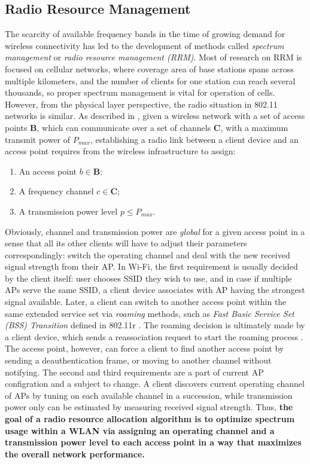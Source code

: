 \subsection{Radio Resource Management}
\label{chap:intro:sec:rrm}
The scarcity of available frequency bands in the time of growing demand for wireless connectivity has led to the development of methods called \textit{spectrum management} or \textit{radio resource management (RRM)}. Most of research on RRM is focused on cellular networks, where coverage area of base stations spans across multiple kilometers, and the number of clients for one station can reach several thousands, so proper spectrum management is vital for operation of cells. However, from the physical layer perspective, the radio situation in 802.11 networks is similar. As described in \cite{zanderRadioResourceManagement1997}, given a wireless network with a set of access points $\boldsymbol{B}$, which can communicate over a set of channels $\boldsymbol{C}$, with a maximum transmit power of $P_{max}$, establishing a radio link between a client device and an access point requires from the wireless infrastructure to assign:
\begin{enumerate}
    \item An access point $b \in \boldsymbol{B}$;
    \item A frequency channel $c \in \boldsymbol{C}$;
    \item A transmission power level $ p \leq P_{max}$.
\end{enumerate}
Obviously, channel and transmission power are \textit{global} for a given access point in a sense that all its other clients will have to adjust their parameters correspondingly: switch the operating channel and deal with the new received signal strength from their AP.
In Wi-Fi, the first requirement is usually decided by the client itself: user chooses SSID they wish to use, and in case if multiple APs serve the same SSID, a client device associates with AP having the strongest signal available. Later, a client can switch to another access point within the same extended service set via \textit{roaming} methods, such as \textit{Fast Basic Service Set (BSS) Transition} defined in 802.11r \cite{80211r}. The roaming decision is ultimately made by a client device, which sends a reassociation request to start the roaming process \cite{colemanCWNACertifiedWireless2021}. The access point, however, can force a client to find another access point by sending a deauthentication frame, or moving to another channel without notifying.
The second and third requirements are a part of current AP configration and a subject to change. A client discovers current operating channel of APs by tuning on each available channel in a succession, while transmission power only can be estimated by measuring received signal strength.
Thus, \textbf{the goal of a radio resource allocation algorithm is to optimize spectrum usage within a WLAN via assigning an operating channel and a transmission power level to each access point in a way that maximizes the overall network performance.}

